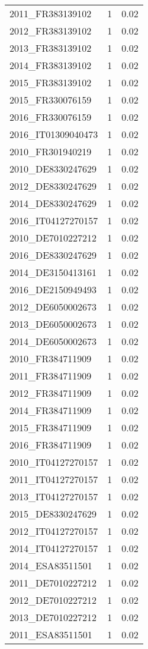 \begin{table*}[htbp]
\begin{tabular}{lrr}
2011_FR383139102 & 1 & 0.02 \\
2012_FR383139102 & 1 & 0.02 \\
2013_FR383139102 & 1 & 0.02 \\
2014_FR383139102 & 1 & 0.02 \\
2015_FR383139102 & 1 & 0.02 \\
2015_FR330076159 & 1 & 0.02 \\
2016_FR330076159 & 1 & 0.02 \\
2016_IT01309040473 & 1 & 0.02 \\
2010_FR301940219 & 1 & 0.02 \\
2010_DE8330247629 & 1 & 0.02 \\
2012_DE8330247629 & 1 & 0.02 \\
2014_DE8330247629 & 1 & 0.02 \\
2016_IT04127270157 & 1 & 0.02 \\
2010_DE7010227212 & 1 & 0.02 \\
2016_DE8330247629 & 1 & 0.02 \\
2014_DE3150413161 & 1 & 0.02 \\
2016_DE2150949493 & 1 & 0.02 \\
2012_DE6050002673 & 1 & 0.02 \\
2013_DE6050002673 & 1 & 0.02 \\
2014_DE6050002673 & 1 & 0.02 \\
2010_FR384711909 & 1 & 0.02 \\
2011_FR384711909 & 1 & 0.02 \\
2012_FR384711909 & 1 & 0.02 \\
2014_FR384711909 & 1 & 0.02 \\
2015_FR384711909 & 1 & 0.02 \\
2016_FR384711909 & 1 & 0.02 \\
2010_IT04127270157 & 1 & 0.02 \\
2011_IT04127270157 & 1 & 0.02 \\
2013_IT04127270157 & 1 & 0.02 \\
2015_DE8330247629 & 1 & 0.02 \\
2012_IT04127270157 & 1 & 0.02 \\
2014_IT04127270157 & 1 & 0.02 \\
2014_ESA83511501 & 1 & 0.02 \\
2011_DE7010227212 & 1 & 0.02 \\
2012_DE7010227212 & 1 & 0.02 \\
2013_DE7010227212 & 1 & 0.02 \\
2011_ESA83511501 & 1 & 0.02 \\

\end{tabular}
\end{table*}
